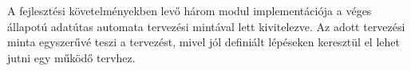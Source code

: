 \tab A fejlesztési követelményekben levő három modul implementációja a véges állapotú adatútas automata\cite{brassai2018ukda} tervezési mintával lett kivitelezve.
Az adott tervezési minta egyszerűvé teszi a tervezést, mivel jól definiált lépéseken keresztül el lehet jutni egy működő tervhez.
